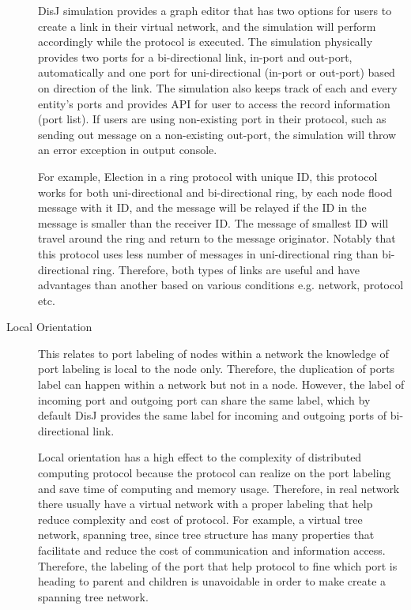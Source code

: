 \begin{description}
DisJ simulation provides a graph editor that has two options for users to create a link in their virtual network, and the simulation will perform accordingly while the protocol is executed. The simulation physically provides two ports for a bi-directional link, in-port and out-port, automatically and one port for uni-directional (in-port or out-port) based on direction of the link. The simulation also keeps track of each and every entity's ports and provides API for user to access the record information (port list). If users are using non-existing port in their protocol, such as sending out message on a non-existing out-port, the simulation will throw an error exception in output console.

For example, Election in a ring protocol with unique ID, this protocol works for both uni-directional and bi-directional ring, by each node flood message with it ID, and the message will be relayed if the ID in the message is smaller than the receiver ID. The message of smallest ID will travel around the ring and return to the message originator. Notably that this protocol uses less number of messages in uni-directional ring than bi-directional ring. Therefore, both types of links are useful and have advantages than another based on various conditions e.g. network, protocol etc.


\item[Local Orientation]
This relates to port labeling of nodes within a network the knowledge of port labeling is local to the node only. Therefore, the duplication of ports label can happen within a network but not in a node. However, the label of incoming port and outgoing port can share the same label, which by default DisJ provides the same label for incoming and outgoing ports of bi-directional link.

Local orientation has a high effect to the complexity of distributed computing protocol because the protocol can realize on the port labeling and save time of computing and memory usage. Therefore, in real network there usually have a virtual network with a proper labeling that help reduce complexity and cost of protocol. For example, a virtual tree network, spanning tree, since tree structure has many properties that facilitate and reduce the cost of communication and information access. Therefore, the labeling of the port that help protocol to fine which port is heading to parent and children is unavoidable in order to make create a spanning tree network.


\end{description}
